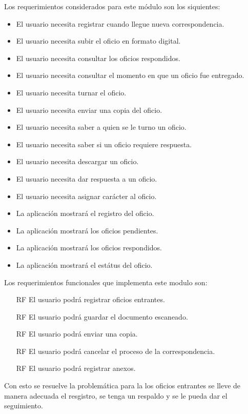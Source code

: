 Los requerimientos considerados para este módulo son los siquientes:

\begin{itemize}
	\item El usuario necesita registrar cuando llegue nueva correspondencia.
	\item El usuario necesita subir el oficio en formato digital.
	\item El usuario necesita consultar los oficios respondidos.
	\item El usuario necesita consultar el momento en que un oficio fue entregado.
	\item El usuario necesita turnar el oficio.
	\item El usuario necesita enviar una copia del oficio.
	\item El usuario necesita saber a quien se le turno un oficio.
	\item El usuario necesita saber si un oficio requiere respuesta.
	\item El usuario necesita descargar un oficio.
	\item El usuario necesita dar respuesta a un oficio.
	\item El usuario necesita asignar carácter al oficio.
	\item La aplicación mostrará el registro del oficio.
	\item La aplicación mostrará los oficios pendientes.
	\item La aplicación mostrará los oficios respondidos.
	\item La aplicación mostrará el estátus del oficio.
\end{itemize}

Los requerimientos funcionales que implementa este modulo son: 

\begin{itemize}
	\item[RF] El usuario podrá registrar oficios entrantes.
	\item[RF] El usuario podrá guardar el documento escaneado.
	\item[RF] El usuario podrá enviar una copia.
	\item[RF] El usuario podrá cancelar el proceso de la correspondencia.
	\item[RF] El usuario podrá registrar anexos.
\end{itemize}

Con esto se resuelve la problemática para la los oficios entrantes se lleve de manera adecuada el resgistro, se tenga un respaldo y se le pueda dar el seguimiento. 


